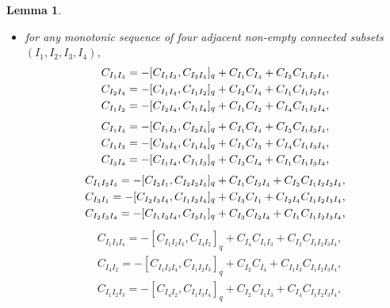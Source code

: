 \documentclass[10pt,a4paper]{amsart}
\numberwithin{equation}{section}
\newtheorem{lemm}[theo]{Lemma}
\theoremstyle{definition}
\begin{document}
\begin{lemm}
\begin{itemize}
\item for any monotonic sequence of four adjacent non-empty connected subsets $(I_1,I_2,I_3,I_4)$,%
\begin{subequations}\label{relaw4a}
\begin{align}
 & C_{I_1I_4}=-[C_{I_1I_2},C_{I_2I_4}]_q+ C_{I_1}C_{I_4}+C_{I_2}C_{I_1I_2I_4} ,\label{relaw43}\\
 & C_{I_2I_4}=-[C_{I_1I_4},C_{I_1I_2}]_q+ C_{I_2}C_{I_4}+C_{I_1}C_{I_1I_2I_4} ,\label{relaw46}\\
&C_{I_1I_2}=-[C_{I_2I_4},C_{I_1I_4}]_q+C_{I_1}C_{I_2}+C_{I_4}C_{I_1I_2I_4},\label{eq:2h3}
\end{align}\vspace{-1.1cm}
\end{subequations}
\begin{subequations}\label{relaw4b}
\begin{align}
 & C_{I_1I_4}=-[C_{I_1I_3},C_{I_3I_4}]_q+C_{I_1}C_{I_4}+C_{I_3}C_{I_1I_3I_4} ,\label{relaw41}\\
 & C_{I_1I_3}=-[C_{I_3I_4},C_{I_1I_4}]_q+ C_{I_1}C_{I_3}+C_{I_4}C_{I_1I_3I_4} ,\label{relaw45}\\
&C_{I_3I_4}=-[C_{I_1I_4},C_{I_1I_3}]_q+C_{I_3}C_{I_4}+C_{I_1}C_{I_1I_3I_4},\label{eq:2h2}
\end{align}\vspace{-1.1cm}
\end{subequations}
\begin{subequations}\label{relaw4c}
\begin{align}
 & C_{I_1I_2I_4}=-[C_{I_3I_1},C_{I_2I_3I_4}]_q+C_{I_1}C_{I_2I_4}+C_{I_3}C_{I_1I_2I_3I_4} ,\label{relaw47}\\
 &C_{I_3I_1}=-[C_{I_2I_3I_4},C_{I_1I_2I_4}]_q+C_{I_3}C_{I_1}+C_{I_2I_4}C_{I_1I_2I_3I_4} ,\label{relaw49}\\
&C_{I_2I_3I_4}=-[C_{I_1I_2I_4}, C_{I_3I_1}]_q +C_{I_3}C_{I_2I_4}+C_{I_1}C_{I_1I_2I_3I_4},\label{eq:2h4}
\end{align}\vspace{-1.1cm}
\end{subequations}
\begin{subequations}\label{relaw4d}
\begin{align}
 & C_{I_1I_3I_4}=-[C_{I_1I_2I_3},C_{I_4I_2}]_q+C_{I_4}C_{I_1I_3}+C_{I_2}C_{I_1I_2I_3I_4} , \label{relaw48} \\
 &C_{I_4I_2}=-[C_{I_1I_3I_4},C_{I_1I_2I_3}]_q+C_{I_2}C_{I_4}+C_{I_1I_3}C_{I_1I_2I_3I_4} ,\label{relaw410}\\
&C_{I_1I_2I_3}=-[C_{I_4I_2}, C_{I_1I_3I_4}]_q +C_{I_2}C_{I_1I_3}+C_{I_4}C_{I_1I_2I_3I_4},\label{eq:2h5}

\end{align}
\end{subequations}
\end{itemize}
\end{lemm}
\end{document}
